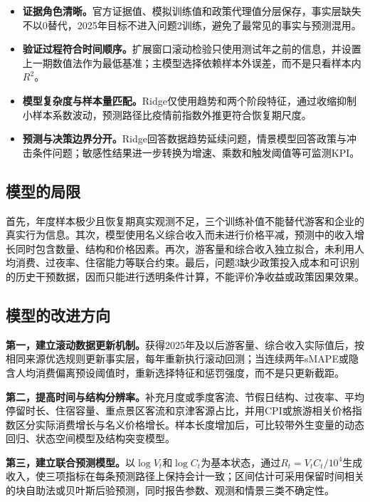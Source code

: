 \documentclass[withoutpreface,bwprint]{cumcmthesis}
\begin{document}
\begin{itemize}
\item \textbf{证据角色清晰。}官方证据值、模拟训练值和政策代理值分层保存，事实层缺失不以0替代，2025年目标不进入问题2训练，避免了最常见的事实与预测混用。
\item \textbf{验证过程符合时间顺序。}扩展窗口滚动检验只使用测试年之前的信息，并设置上一期数值法作为最低基准；主模型选择依赖样本外误差，而不是只看样本内$R^2$。
\item \textbf{模型复杂度与样本量匹配。}Ridge仅使用趋势和两个阶段特征，通过收缩抑制小样本系数波动，预测路径比疫情前指数外推更符合恢复期尺度。
\item \textbf{预测与决策边界分开。}Ridge回答数据趋势延续问题，情景模型回答政策与冲击条件问题；敏感性结果进一步转换为增速、乘数和触发阈值等可监测KPI。
\end{itemize}

\subsection{模型的局限}

首先，年度样本极少且恢复期真实观测不足，三个训练补值不能替代游客和企业的真实行为信息。其次，模型使用名义综合收入而未进行价格平减，预测中的收入增长同时包含数量、结构和价格因素。再次，游客量和综合收入独立拟合，未利用人均消费、过夜率、住宿能力等联合约束。最后，问题3缺少政策投入成本和可识别的历史干预数据，因而只能进行透明条件计算，不能评价净收益或政策因果效果。

\subsection{模型的改进方向}

\textbf{第一，建立滚动数据更新机制。}获得2025年及以后游客量、综合收入实际值后，按相同来源优选规则更新事实层，每年重新执行滚动回测；当连续两年sMAPE或隐含人均消费偏离预设阈值时，重新选择特征和惩罚强度，而不是只更新截距。

\textbf{第二，提高时间与结构分辨率。}补充月度或季度客流、节假日结构、过夜率、平均停留时长、住宿容量、重点景区客流和京津客源占比，并用CPI或旅游相关价格指数区分实际消费增长与名义价格增长。样本长度增加后，可比较带外生变量的动态回归、状态空间模型及结构突变模型。

\textbf{第三，建立联合预测模型。}以$\log V_t$和$\log C_t$为基本状态，通过$R_t=V_tC_t/10^4$生成收入，使三项指标在每条预测路径上保持会计一致；区间估计可采用保留时间相关的块自助法或贝叶斯后验预测，同时报告参数、观测和情景三类不确定性。
\end{document}
